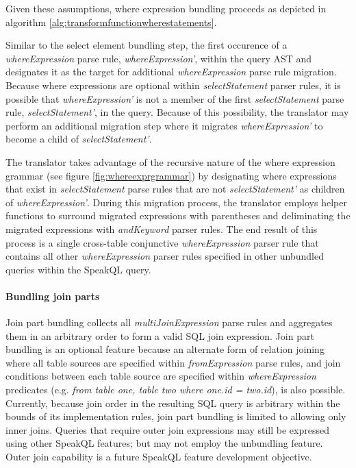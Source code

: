 Given these assumptions, where expression bundling proceeds as depicted in algorithm \ref{alg:transformfunctionwherestatements}.

\TransformFunctionWhereStatements

Similar to the select element bundling step, the first occurence of a \emph{whereExpression} parse rule, \emph{whereExpression'}, within the query AST and designates it as the target for additional \emph{whereExpression} parse rule migration. Because where expressions are optional within \emph{selectStatement} parser rules, it is possible that \emph{whereExpression'} is not a member of the first \emph{selectStatement} parse rule, \emph{selectStatement'}, in the query. Because of this possibility, the translator may perform an additional migration step where it migrates \emph{whereExpression'} to become a child of \emph{selectStatement'}.

The translator takes advantage of the recursive nature of the where expression grammar (see figure \ref{fig:whereexprgrammar}) by designating where expressions that exist in \emph{selectStatement} parse rules that are not \emph{selectStatement'} as children of \emph{whereExpression'}. During this migration process, the translator employs helper functions to surround migrated expressions with parentheses and deliminating the migrated expressions with \emph{andKeyword} parser rules. The end result of this process is a single cross-table conjunctive \emph{whereExpression} parser rule that contains all other \emph{whereExpression} parser rules specified in other unbundled queries within the SpeakQL query. 

\paragraph{Bundling join parts}

Join part bundling collects all \emph{multiJoinExpression} parse rules and aggregates them in an arbitrary order to form a valid SQL join expression. Join part bundling is an optional feature because an alternate form of relation joining where all table sources are specified within \emph{fromExpression} parse rules, and join conditions between each table source are specified within \emph{whereExpression} predicates (e.g. \emph{from table one, table two where one.id = two.id}), is also possible. Currently, because join order in the resulting SQL query is arbitrary within the bounds of its implementation rules, join part bundling is limited to allowing only inner joins. Queries that require outer join expressions may still be expressed using other SpeakQL features; but may not employ the unbundling feature. Outer join capability is a future SpeakQL feature development objective.

